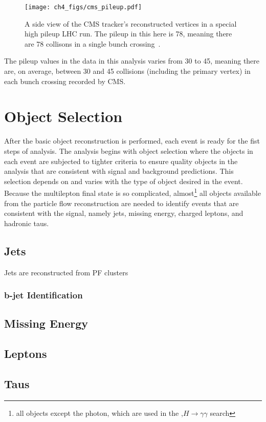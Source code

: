 \begin{figure}[hbtp]
 \begin{center}
   \texttt{[image: ch4\_figs/cms\_pileup.pdf]}
   \caption{A side view of the CMS tracker's reconstructed vertices in a special high pileup LHC run. The pileup in this here is 78, meaning there are
78 collisons in a single bunch crossing~\cite{pileup_image}.}
   \label{fig:pileup_vertices}
 \end{center}
\end{figure}

\noindent The pileup values in the data in this analysis varies from 30 to 45, meaning there are, on average, between 30 and 45 collisions (including the primary vertex) in each
bunch crossing recorded by CMS. 


\section{Object Selection}
After the basic object reconstruction is performed, each event is ready for the fist steps of analysis. The analysis begins with object selection where the objects in each
event are subjected to tighter criteria to ensure quality objects in the analysis that are consistent with signal and background predictions. This selection depends on and 
varies with the type of object desired in the event. Because the \tth multilepton final state is so complicated, almost\footnote{all objects except the photon, which are
used in the \tth,$H\rightarrow\gamma\gamma$ search} all objects available from the particle flow
reconstruction are needed to identify events that are consistent with the signal, namely jets, missing energy, charged leptons, and hadronic taus.

\subsection{Jets}
Jets are reconstructed from PF clusters 
\subsubsection{b-jet Identification}
\subsection{Missing Energy}
\subsection{Leptons}
\subsection{Taus}

